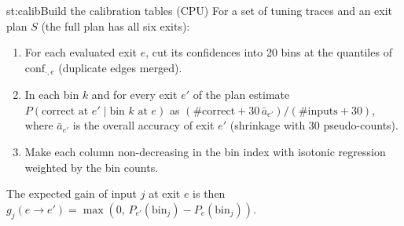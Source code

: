 \begin{step}{st:calib}{Build the calibration tables (CPU)}
For a set of tuning traces and an exit plan $S$ (the full plan has all six exits):
\begin{enumerate}
  \item For each evaluated exit $e$, cut its confidences into 20 bins at the quantiles of $\text{conf}_{\cdot,e}$
  (duplicate edges merged).
  \item In each bin $k$ and for every exit $e'$ of the plan estimate $P(\text{correct at } e' \mid \text{bin } k
  \text{ at } e)$ as $(\#\text{correct}+30\,\bar a_{e'})/(\#\text{inputs}+30)$, where $\bar a_{e'}$ is the overall
  accuracy of exit $e'$ (shrinkage with 30 pseudo-counts).
  \item Make each column non-decreasing in the bin index with isotonic regression weighted by the bin counts.
\end{enumerate}
The expected gain of input $j$ at exit $e$ is then $g_j(e\to e')=\max(0,\,P_{e'}(\text{bin}_j)-P_e(\text{bin}_j))$.
\end{step}

